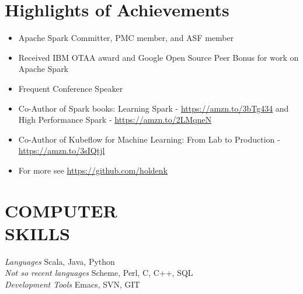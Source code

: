 \documentclass[10pt,line,margin=0.1]{newsres}
\begin{document}
\address{San Francisco, CA, USA}
\address{E-mail: holden@pigscanfly.ca, Cell: (425) 233-8271}
 
\begin{resume}
\section{Highlights of Achievements}
  \begin{itemize}  \itemsep -2pt %
  \item{Apache Spark Committer, PMC member, and ASF member}
  \item{Received IBM OTAA award and Google Open Source Peer Bonus for work on Apache Spark}
  \item{Frequent Conference Speaker}
  \item{Co-Author of Spark books: Learning Spark - \url{https://amzn.to/3bTg434} and High Performance Spark - \url{https://amzn.to/2LMqneN}}
  \item{Co-Author of Kubeflow for Machine Learning: From Lab to Production  - \url{https://amzn.to/3sIQtjl}}
  \item{For more see \url{https://github.com/holdenk}}
\end{itemize}
  \section{COMPUTER \\ SKILLS} {\sl Languages} Scala, Java, Python \\
                {\sl Not so recent languages} Scheme, Perl, C, C++, SQL \\
                {\sl Development Tools} Emacs, SVN, GIT \\
 

\end{resume}
\end{document}

